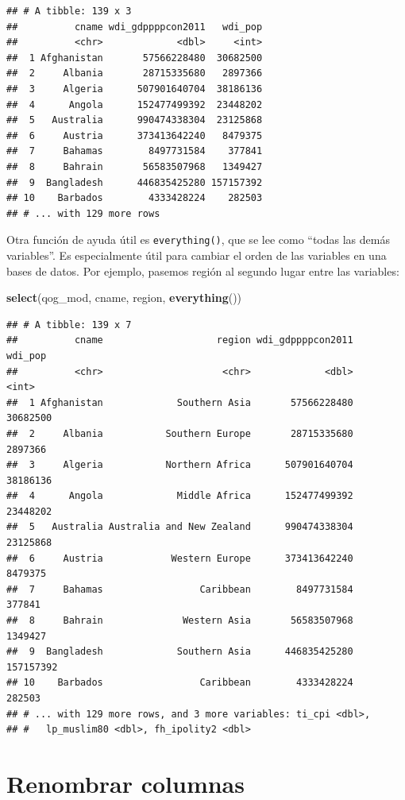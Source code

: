 \documentclass[]{book}
\newenvironment{Shaded}{\begin{snugshade}}{\end{snugshade}}
\newcommand{\KeywordTok}[1]{\textcolor[rgb]{0.13,0.29,0.53}{\textbf{#1}}}
\newcommand{\NormalTok}[1]{#1}
\begin{document}
\begin{verbatim}
## # A tibble: 139 x 3
##          cname wdi_gdppppcon2011   wdi_pop
##          <chr>             <dbl>     <int>
##  1 Afghanistan       57566228480  30682500
##  2     Albania       28715335680   2897366
##  3     Algeria      507901640704  38186136
##  4      Angola      152477499392  23448202
##  5   Australia      990474338304  23125868
##  6     Austria      373413642240   8479375
##  7     Bahamas        8497731584    377841
##  8     Bahrain       56583507968   1349427
##  9  Bangladesh      446835425280 157157392
## 10    Barbados        4333428224    282503
## # ... with 129 more rows
\end{verbatim}

Otra función de ayuda útil es \texttt{everything()}, que se lee como
``todas las demás variables''. Es especialmente útil para cambiar el
orden de las variables en una bases de datos. Por ejemplo, pasemos
región al segundo lugar entre las variables:

\begin{Shaded}
\begin{Highlighting}[]
\KeywordTok{select}\NormalTok{(qog_mod, cname, region, }\KeywordTok{everything}\NormalTok{())}
\end{Highlighting}
\end{Shaded}

\begin{verbatim}
## # A tibble: 139 x 7
##          cname                    region wdi_gdppppcon2011   wdi_pop
##          <chr>                     <chr>             <dbl>     <int>
##  1 Afghanistan             Southern Asia       57566228480  30682500
##  2     Albania           Southern Europe       28715335680   2897366
##  3     Algeria           Northern Africa      507901640704  38186136
##  4      Angola             Middle Africa      152477499392  23448202
##  5   Australia Australia and New Zealand      990474338304  23125868
##  6     Austria            Western Europe      373413642240   8479375
##  7     Bahamas                 Caribbean        8497731584    377841
##  8     Bahrain              Western Asia       56583507968   1349427
##  9  Bangladesh             Southern Asia      446835425280 157157392
## 10    Barbados                 Caribbean        4333428224    282503
## # ... with 129 more rows, and 3 more variables: ti_cpi <dbl>,
## #   lp_muslim80 <dbl>, fh_ipolity2 <dbl>
\end{verbatim}

\section{Renombrar columnas}\label{renombrar-columnas}
\end{document}
